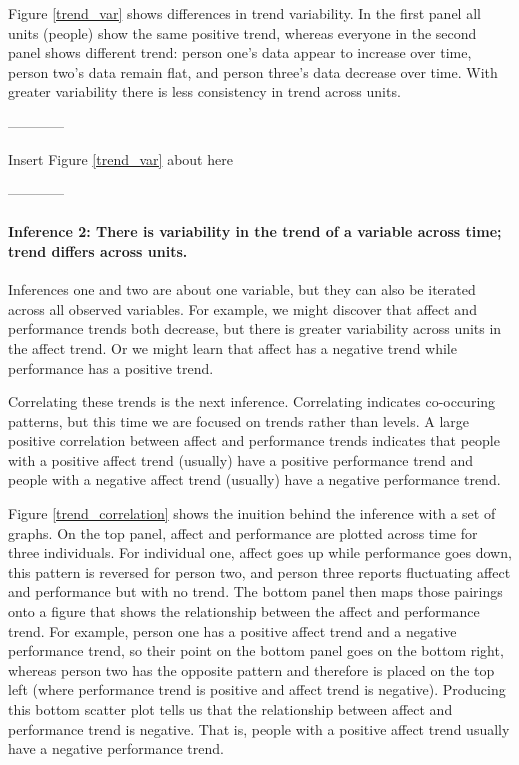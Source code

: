 \documentclass[english,,man]{apa6}
\let\oldparagraph\paragraph
\renewcommand{\paragraph}[1]{\oldparagraph{#1}\mbox{}}
\theoremstyle{definition}
\theoremstyle{definition}
\theoremstyle{definition}
\theoremstyle{remark}
\begin{document}
Figure \ref{trend_var} shows differences in trend variability. In the
first panel all units (people) show the same positive trend, whereas
everyone in the second panel shows different trend: person one's data
appear to increase over time, person two's data remain flat, and person
three's data decrease over time. With greater variability there is less
consistency in trend across units.

\begin{center}

------------

Insert Figure \ref{trend_var} about here

------------

\end{center}

\hypertarget{inference-2-there-is-variability-in-the-trend-of-a-variable-across-time-trend-differs-across-units.}{%
\paragraph{Inference 2: There is variability in the trend of a variable
across time; trend differs across
units.}\label{inference-2-there-is-variability-in-the-trend-of-a-variable-across-time-trend-differs-across-units.}}

Inferences one and two are about one variable, but they can also be
iterated across all observed variables. For example, we might discover
that affect and performance trends both decrease, but there is greater
variability across units in the affect trend. Or we might learn that
affect has a negative trend while performance has a positive trend.

Correlating these trends is the next inference. Correlating indicates
co-occuring patterns, but this time we are focused on trends rather than
levels. A large positive correlation between affect and performance
trends indicates that people with a positive affect trend (usually) have
a positive performance trend and people with a negative affect trend
(usually) have a negative performance trend.

Figure \ref{trend_correlation} shows the inuition behind the inference
with a set of graphs. On the top panel, affect and performance are
plotted across time for three individuals. For individual one, affect
goes up while performance goes down, this pattern is reversed for person
two, and person three reports fluctuating affect and performance but
with no trend. The bottom panel then maps those pairings onto a figure
that shows the relationship between the affect and performance trend.
For example, person one has a positive affect trend and a negative
performance trend, so their point on the bottom panel goes on the bottom
right, whereas person two has the opposite pattern and therefore is
placed on the top left (where performance trend is positive and affect
trend is negative). Producing this bottom scatter plot tells us that the
relationship between affect and performance trend is negative. That is,
people with a positive affect trend usually have a negative performance
trend.
\end{document}
